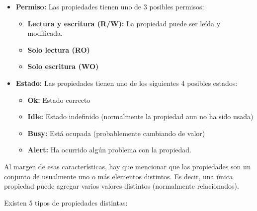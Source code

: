 \begin{itemize}
  \item \textbf{Permiso:} Las propiedades tienen uno de 3 posibles permisos:
    \begin{itemize}
     \item \textbf{Lectura y escritura (R/W):} La propiedad puede ser leída y modificada.
     \item \textbf{Solo lectura (RO)}
     \item \textbf{Solo escritura (WO)}
    \end{itemize}

  \item \textbf{Estado:} Las propiedades tienen uno de los siguientes 4 posibles estados:
    \begin{itemize}
     \item \textbf{Ok:} Estado correcto
     \item \textbf{Idle:} Estado indefinido (normalmente la propiedad aun no ha sido usada)
     \item \textbf{Busy:} Está ocupada (probablemente cambiando de valor)
     \item \textbf{Alert:} Ha ocurrido algún problema con la propiedad.
    \end{itemize}
\end{itemize}

\bigskip
Al margen de esas características, hay que mencionar que las propiedades son un conjunto de usualmente uno o más elementos distintos. Es decir, una única propiedad puede agregar varios valores distintos (normalmente relacionados).

Existen 5 tipos de propiedades distintas:

